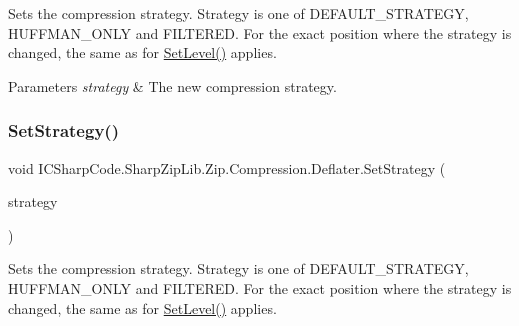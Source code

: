 Sets the compression strategy. Strategy is one of D\+E\+F\+A\+U\+L\+T\+\_\+\+S\+T\+R\+A\+T\+E\+GY, H\+U\+F\+F\+M\+A\+N\+\_\+\+O\+N\+LY and F\+I\+L\+T\+E\+R\+ED. For the exact position where the strategy is changed, the same as for \hyperlink{class_i_c_sharp_code_1_1_sharp_zip_lib_1_1_zip_1_1_compression_1_1_deflater_aeec1f91af74741790108b3af8f877b5e}{Set\+Level()} applies. 


\begin{DoxyParams}{Parameters}
{\em strategy} & The new compression strategy. \\
\hline
\end{DoxyParams}
\mbox{\label{class_i_c_sharp_code_1_1_sharp_zip_lib_1_1_zip_1_1_compression_1_1_deflater_a1d3cf927ab2a1e6c6a477d9e2d2a1e93}} 
\subsubsection{\texorpdfstring{Set\+Strategy()}{SetStrategy()}\hspace{0.1cm}{\footnotesize\ttfamily [2/2]}}
{\footnotesize\ttfamily void I\+C\+Sharp\+Code.\+Sharp\+Zip\+Lib.\+Zip.\+Compression.\+Deflater.\+Set\+Strategy (\begin{DoxyParamCaption}\item[{\hyperlink{namespace_i_c_sharp_code_1_1_sharp_zip_lib_1_1_zip_1_1_compression_a922c175879503e6b9e35641deccfbc40}{Deflate\+Strategy}}]{strategy }\end{DoxyParamCaption})\hspace{0.3cm}{\ttfamily [inline]}}



Sets the compression strategy. Strategy is one of D\+E\+F\+A\+U\+L\+T\+\_\+\+S\+T\+R\+A\+T\+E\+GY, H\+U\+F\+F\+M\+A\+N\+\_\+\+O\+N\+LY and F\+I\+L\+T\+E\+R\+ED. For the exact position where the strategy is changed, the same as for \hyperlink{class_i_c_sharp_code_1_1_sharp_zip_lib_1_1_zip_1_1_compression_1_1_deflater_aeec1f91af74741790108b3af8f877b5e}{Set\+Level()} applies. 


